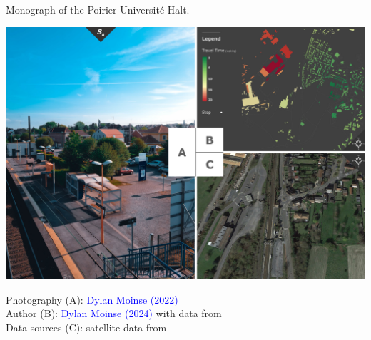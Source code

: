 \begin{refsegment}
\begin{carte}[h!]\vspace*{4pt}
\caption{Monograph of the Poirier Université Halt.}
\label{fig-chap3:monographie-le-poirier}
\centerline{\includegraphics[height=.35\pageheight]{src/Figures/Chap-3/EN_Gare_Poirier.jpg}}
\vspace{5pt}
\begin{flushright}\scriptsize{
Photography (A): \textcolor{blue}{Dylan Moinse (2022)}
\\
Author (B): \textcolor{blue}{Dylan Moinse (2024)} with data from \textcolor{blue}{\textcite{openstreetmap_openstreetmap_2023}}
\\
Data sources (C): satellite data from \textcolor{blue}{\textcite{google_earth_google_2023}}
}\end{flushright}
\end{carte}


\end{refsegment}
